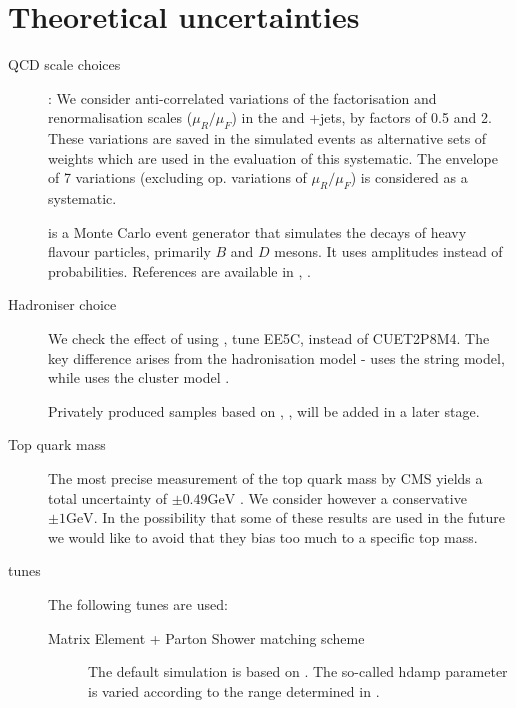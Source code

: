 \section{Theoretical uncertainties}
\begin{description}

\item[QCD scale choices]:
  We consider anti-correlated variations of the factorisation and renormalisation scales ($\mu_R/\mu_F$) in the \ttbar and \PW+jets, by factors of 0.5 and 2. These variations are saved in the simulated events as alternative sets of weights which are used in the evaluation of this systematic. The envelope of 7 variations (excluding op. variations of $\mu_R/\mu_F$) is considered as a systematic.

\item[\EVTGEN] \EVTGEN is a Monte Carlo event generator that simulates the decays of heavy flavour particles, primarily $B$ and $D$ mesons. It uses amplitudes instead of probabilities. References are available in \cite{evtgen}, \cite{Lange:2001uf}.

\item[Hadroniser choice] We check the effect of using \HERWIGpp \cite{Bahr:2008pv}, tune EE5C\cite{Seymour:2013qka}, instead of  CUET2P8M4. The key difference arises from the hadronisation model - \PYTHIA uses the string model, while \HERWIGpp uses the cluster model \cite{Sjostrand:hadronisation}. 

  Privately produced samples based on \SHERPA \cite{Gleisberg:2008ta}, \DIRE \cite{Hoche:2015sya},  \cite{Bellm:2015jjp} will be added in a later stage.

\item[Top quark mass] The most precise measurement of the top quark mass by CMS yields a total uncertainty of $\pm 0.49 \text{GeV}$ \cite{Khachatryan:2015hba}. We consider however a conservative $\pm 1 \text{GeV}$. In the possibility that some of these results are used in the future we would like to avoid that they bias too much to a specific top mass.

\item[\PYTHIA tunes] The following \PYTHIA tunes are used:
  
  \begin{description}
    
  \item[Matrix Element + Parton Shower matching scheme] The default simulation is based on \POWHEG. The so-called hdamp parameter is varied according to the range determined in \cite{CMS-PAS-TOP-13-007}.


\end{description}
\end{description}
